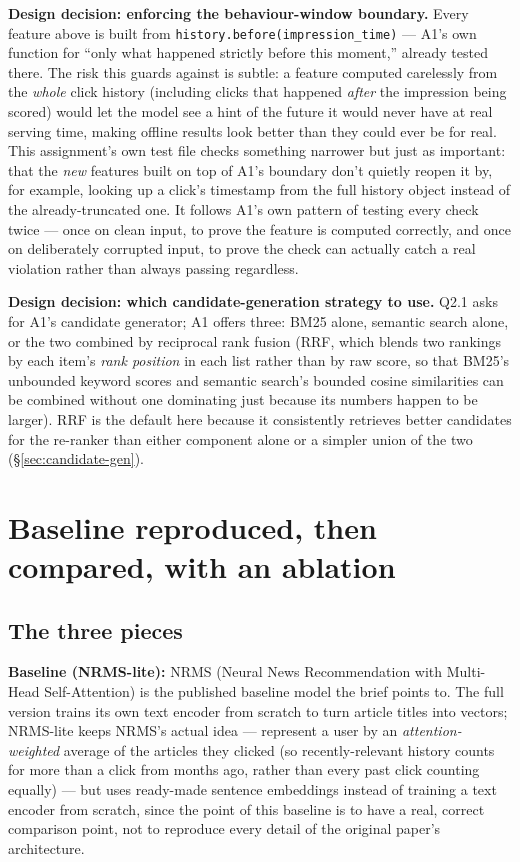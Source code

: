 \documentclass[11pt,a4paper]{article}
\begin{document}
\textbf{Design decision: enforcing the behaviour-window boundary.} Every feature above is built
from \texttt{history.before(impression\_time)} --- A1's own function for ``only what happened
strictly before this moment,'' already tested there. The risk this guards against is subtle: a
feature computed carelessly from the \emph{whole} click history (including clicks that happened
\emph{after} the impression being scored) would let the model see a hint of the future it would
never have at real serving time, making offline results look better than they could ever be for
real. This assignment's own test file checks something narrower but just as important: that the
\emph{new} features built on top of A1's boundary don't quietly reopen it by, for example, looking
up a click's timestamp from the full history object instead of the already-truncated one. It
follows A1's own pattern of testing every check twice --- once on clean input, to prove the
feature is computed correctly, and once on deliberately corrupted input, to prove the check can
actually catch a real violation rather than always passing regardless.

\textbf{Design decision: which candidate-generation strategy to use.} Q2.1 asks for A1's candidate
generator; A1 offers three: BM25 alone, semantic search alone, or the two combined by reciprocal
rank fusion (RRF, which blends two rankings by each item's \emph{rank position} in each list
rather than by raw score, so that BM25's unbounded keyword scores and semantic search's bounded
cosine similarities can be combined without one dominating just because its numbers happen to be
larger). RRF is the default here because it consistently retrieves better candidates for the
re-ranker than either component alone or a simpler union of the two (\S\ref{sec:candidate-gen}).

\section{Baseline reproduced, then compared, with an ablation}
\label{sec:baseline}

\subsection{The three pieces}

\textbf{Baseline (NRMS-lite):} NRMS (Neural News Recommendation with Multi-Head Self-Attention) is
the published baseline model the brief points to. The full version trains its own text encoder
from scratch to turn article titles into vectors; NRMS-lite keeps NRMS's actual idea --- represent
a user by an \emph{attention-weighted} average of the articles they clicked (so recently-relevant
history counts for more than a click from months ago, rather than every past click counting
equally) --- but uses ready-made sentence embeddings instead of training a text encoder from
scratch, since the point of this baseline is to have a real, correct comparison point, not to
reproduce every detail of the original paper's architecture.
\end{document}
